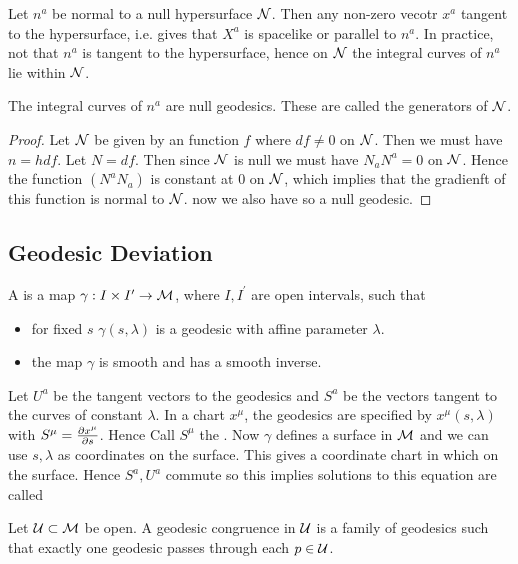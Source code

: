 \documentclass{article}
\begin{document}
Let $n^a$ be normal to a null hypersurface $\mc{N}$. Then any non-zero vecotr $x^a$ tangent to the hypersurface, i.e. 
gives that $X^a$ is spacelike or parallel to $n^a$. In practice, not that $n^a$ is tangent to the hypersurface, hence on $\mc{N}$ the integral curves of $n^a$ lie within $\mc{N}$. 

\begin{prop}
The integral curves of $n^a$ are null geodesics. These are called the generators of $\mc{N}$. 
\end{prop}
\begin{proof}
Let $\mc{N}$ be given by an function $f$
where $df \neq  0$  on $\mc{N}$. Then we must have $n=h df$. Let $N=df$. Then since $\mc{N}$ is null we must have $N_a N^a = 0$ on $\mc{N}$. Hence the function $(N^a N_a)$ is constant at 0 on $\mc{N}$, which implies that the gradienft of this function is normal to $\mc{N}$. 
now we also have 
so a null geodesic. 
\end{proof}

\subsection{Geodesic Deviation}

\begin{definition}
A  is a map $\gamma : I\times I^\prime \to \mc{M}$, where $I,I^\prime$ are open intervals, such that 
\begin{itemize}
    \item for fixed $s$ $\gamma(s,\lambda)$ is a geodesic with affine parameter $\lambda$. 
    \item the map $\gamma$ is smooth and has a smooth inverse. 
\end{itemize}
\end{definition}

Let $U^a$ be the tangent vectors to the geodesics and $S^a$ be the vectors tangent to the curves of constant $\lambda$. In a chart $x^\mu$, the geodesics are specified by $x^\mu(s,\lambda)$ with $S^\mu = \pd[x^\mu]{s}$. Hence 
Call $S^\mu$ the . Now $\gamma$ defines a surface in $\mc{M}$ and we can use $s,\lambda$ as coordinates on the surface. This gives a coordinate chart in which  
on the surface. Hence $S^a, U^a$ commute 
so this implies 
solutions to this equation are called  

\begin{definition}
Let $\mc{U} \subset \mc{M}$ be open. A geodesic congruence in $\mc{U}$ is a family of geodesics such that exactly one geodesic passes through each $p \in \mc{U}$. 
\end{definition}
\end{document}
